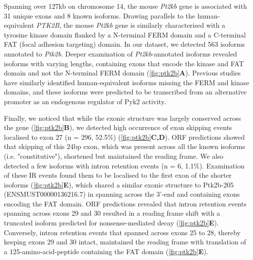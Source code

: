 Spanning over 127kb on chromosome 14, the mouse \textit{Pt2kb} gene is associated with 31 unique exons and 8 known isoforms. Drawing parallels to the human-equivalent \textit{PTK2B}, the mouse \textit{Pt2kb} gene is similarly characterised with a tyrosine kinase domain flanked by a N-terminal FERM domain and a C-terminal FAT (focal adhesion targeting) domain\cite{DePins2021}. In our dataset, we detected 563 isoforms annotated to \textit{Ptk2b}. Deeper examination of \textit{Pt2kb}-annotated isoforms revealed isoforms with varying lengths, containing exons that encode the kinase and FAT domain and not the N-terminal FERM domain (\cref{fig:ptk2b}\textbf{A}). Previous studies have similarly identified human-equivalent isoforms missing the FERM and kinase domains\cite{DePins2021}, and these isoforms were predicted to be transcribed from an alternative promoter as an endogenous regulator of Pyk2 activity\cite{DePins2021}.

Finally, we noticed that while the exonic structure was largely conserved across the gene (\cref{fig:ptk2b}\textbf{B}), we detected high occurrence of exon skipping events localised to exon 27 (n = 296, 52.5\%) (\cref{fig:ptk2b}\textbf{C,D}). ORF predictions showed that skipping of this 24bp exon, which was present across all the known isoforms (i.e. "constitutive"), shortened but maintained the reading frame. We also detected a few isoforms with intron retention events (n = 6, 1.1\%). Examination of these IR events found them to be localised to the first exon of the shorter isoforms  (\cref{fig:ptk2b}\textbf{E}), which shared a similar exonic structure to Ptk2b-205 (ENSMUST00000136216.7) in spanning across the 3'-end and containing exons encoding the FAT domain. ORF predictions revealed that intron retention events spanning across exons 29 and 30 resulted in a reading frame shift with a truncated isoform predicted for nonsense-mediated decay (\cref{fig:ptk2b}\textbf{E}). Conversely, intron retention events that spanned across exons 25 to 28, thereby keeping exons 29 and 30 intact, maintained the reading frame with translation of a 125-amino-acid-peptide containing the FAT domain (\cref{fig:ptk2b}\textbf{E}). 


